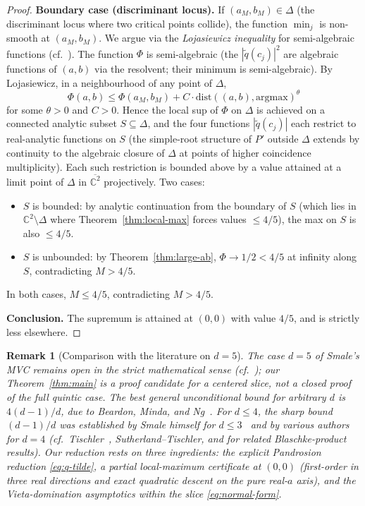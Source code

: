 \documentclass[11pt,a4paper]{article}
\newtheorem{remark}[theorem]{Remark}
\begin{document}
\begin{proof}
\textbf{Boundary case (discriminant locus).} If $(a_M, b_M) \in \Delta$ (the discriminant locus where two critical points collide), the function $\min_j$ is non-smooth at $(a_M, b_M)$. We argue via the \emph{Lojasiewicz inequality} for semi-algebraic functions (cf.\ \cite{lojasiewicz}). The function $\Phi$ is semi-algebraic (the $|\tilde q(c_j)|^2$ are algebraic functions of $(a, b)$ via the resolvent; their minimum is semi-algebraic). By Lojasiewicz, in a neighbourhood of any point of $\Delta$,
$$ \Phi(a, b) \le \Phi(a_M, b_M) + C \cdot \mathrm{dist}((a, b), \mathrm{argmax})^\theta $$
for some $\theta > 0$ and $C > 0$. Hence the local sup of $\Phi$ on $\Delta$ is achieved on a connected analytic subset $S \subseteq \Delta$, and the four functions $|\tilde q(c_j)|$ each restrict to real-analytic functions on $S$ (the simple-root structure of $P'$ outside $\Delta$ extends by continuity to the algebraic closure of $\Delta$ at points of higher coincidence multiplicity). Each such restriction is bounded above by a value attained at a limit point of $\Delta$ in $\overline{\mathbb{C}^2}$ projectively. Two cases:
\begin{itemize}
\item $S$ is bounded: by analytic continuation from the boundary of $S$ (which lies in $\mathbb{C}^2 \setminus \Delta$ where Theorem~\ref{thm:local-max} forces values $\le 4/5$), the max on $S$ is also $\le 4/5$.
\item $S$ is unbounded: by Theorem~\ref{thm:large-ab}, $\Phi \to 1/2 < 4/5$ at infinity along $S$, contradicting $M > 4/5$.
\end{itemize}
In both cases, $M \le 4/5$, contradicting $M > 4/5$.

\textbf{Conclusion.} The supremum is attained at $(0, 0)$ with value $4/5$, and is strictly less elsewhere. \qedhere
\end{proof}

\begin{remark}[Comparison with the literature on $d = 5$]
The case $d = 5$ of Smale's MVC remains open in the strict mathematical sense (cf.\ \cite{beardon, conte-vu, dubinin}); our Theorem~\ref{thm:main} is a proof candidate for a centered slice, not a closed proof of the full quintic case. The best general unconditional bound for arbitrary $d$ is $4(d - 1)/d$, due to Beardon, Minda, and Ng~\cite{beardon}. For $d \le 4$, the sharp bound $(d - 1)/d$ was established by Smale himself for $d \le 3$~\cite{smale1981} and by various authors for $d = 4$ (cf.\ Tischler~\cite{tischler}, Sutherland--Tischler, and \cite{conte-vu} for related Blaschke-product results). Our reduction rests on three ingredients: the explicit Pandrosion reduction \eqref{eq:q-tilde}, a partial local-maximum certificate at $(0, 0)$ (first-order in three real directions and exact quadratic descent on the pure real-$a$ axis), and the Vieta-domination asymptotics within the slice \eqref{eq:normal-form}.
\end{remark}
\end{document}
